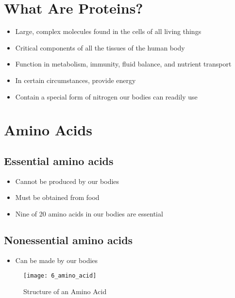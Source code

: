 \documentclass[title={Chapter 6}]{fdsn201notes}
\begin{document}
\maketitle
\setcounter{chapter}{6}

\section{What Are Proteins?}\label{sec:what-are-proteins?}
\begin{itemize}
	\item Large, complex molecules found in the cells of all living things
	\item Critical components of all the tissues of the human body
	\item Function in metabolism, immunity, fluid balance, and nutrient transport
	\item In certain circumstances, provide energy
	\item Contain a special form of nitrogen our bodies can readily use
\end{itemize}

\section{Amino Acids}\label{sec:amino-acids}

\subsection{Essential amino acids}\label{subsec:essential-amino-acids}
\begin{itemize}
	\item Cannot be produced by our bodies
	\item Must be obtained from food
	\item Nine of 20 amino acids in our bodies are essential
\end{itemize}

\subsection{Nonessential amino acids}\label{subsec:nonessential-amino-acids}
\begin{itemize}
	\item Can be made by our bodies
\end{itemize}

\begin{figure}[H]
	\centering
	\texttt{[image: 6\_amino\_acid]}
	\caption{Structure of an Amino Acid}
	\label{fig:amino-acid-structure}
\end{figure}
\end{document}

